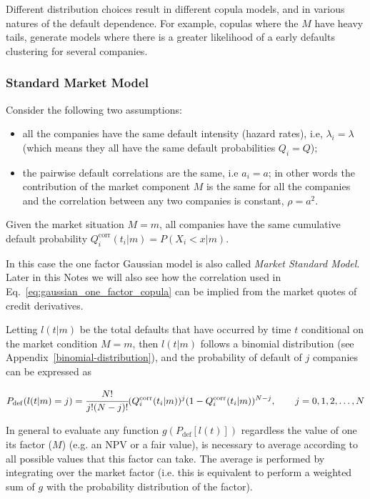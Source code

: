 Different distribution choices result in different copula models, and in various natures of the default dependence. For example, copulas where the $M$ have heavy tails, generate models where there is a greater likelihood of a early defaults clustering for several companies.

\subsubsection{Standard Market Model}
\label{standard-market-model}

Consider the following two assumptions:

\begin{itemize}
\tightlist
\item all the companies have the same default intensity (hazard rates), i.e, $\lambda_i = \lambda$ (which means they all have the same default probabilities $Q_i = Q$);
\item the pairwise default correlations are the same, i.e $a_i = a$; in other words the contribution of the market component $M$ is the same for all the companies and the correlation between any two companies is constant, $\rho = a^2$.
\end{itemize}

Given the market situation $M = m$, all companies have the same cumulative default probability $Q_i^{\textrm{corr}}(t_i|m)=P(X_i < x|m)$. 

In this case the one factor Gaussian model is also called \emph{Market Standard Model}. Later in this Notes we will also see how the correlation used in Eq.~\ref{eq:gaussian_one_factor_copula} can be implied from the market quotes of credit derivatives.

Letting $l(t|m)$ be the total defaults that have occurred by time $t$ conditional on the market condition $M = m$, then $l(t|m)$ follows a binomial distribution (see Appendix~\ref{binomial-distribution}), and the probability of default of $j$ companies can be expressed as

\begin{equation}
P_{\mathrm{def}}(l(t|m) = j) = \cfrac{N!}{j!(N-j)!}(Q_i^{\textrm{corr}}(t_i|m))^j(1-Q_i^{\textrm{corr}}(t_i|m))^{N-j},\qquad  j=0, 1, 2,\ldots,N
\end{equation}

In general to evaluate any function $g(P_{\mathrm{def}}[l(t)])$ regardless the value of one its factor ($M$) (e.g. an NPV or a fair value), is necessary to average according to all possible values that this factor can take. The average is performed by integrating over the market factor (i.e. this is equivalent to perform a weighted sum of $g$ with the probability distribution of the factor).  

